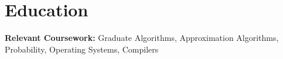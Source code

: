\section*{Education}

\textbf{Relevant Coursework:} Graduate Algorithms, Approximation Algorithms, Probability, Operating Systems, Compilers
